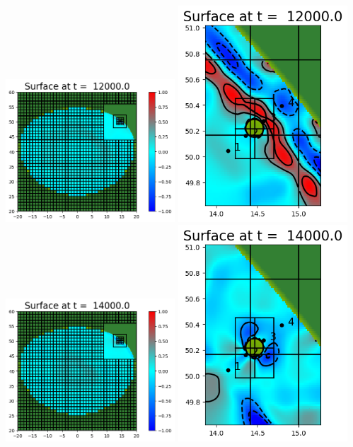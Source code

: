 \documentclass[11pt]{article}
\begin{document}
\vskip 10pt 
\includegraphics[width=0.475\textwidth]{frame0006fig0.png}
\includegraphics[width=0.475\textwidth]{frame0006fig7.png}
\vskip 10pt 
\includegraphics[width=0.475\textwidth]{frame0007fig0.png}
\includegraphics[width=0.475\textwidth]{frame0007fig7.png}
\end{document}
